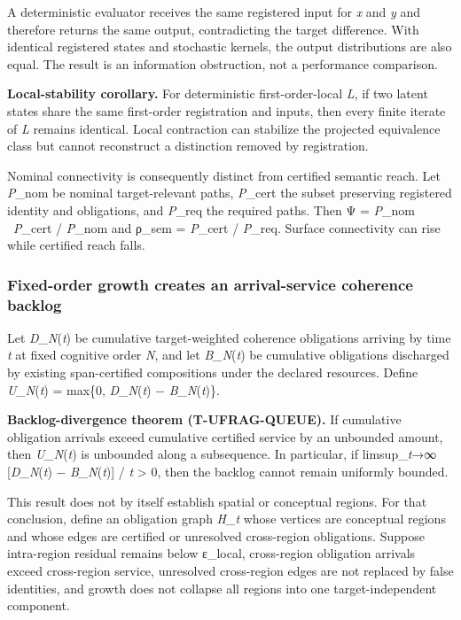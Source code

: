 A deterministic evaluator receives the same registered input for
\emph{x} and \emph{y} and therefore returns the same output,
contradicting the target difference. With identical registered states
and stochastic kernels, the output distributions are also equal. The
result is an information obstruction, not a performance comparison.

\textbf{Local-stability corollary.} For deterministic first-order-local
\emph{L}, if two latent states share the same first-order registration
and inputs, then every finite iterate of \emph{L} remains identical.
Local contraction can stabilize the projected equivalence class but
cannot reconstruct a distinction removed by registration.

Nominal connectivity is consequently distinct from certified semantic
reach. Let \emph{P}\_nom be nominal target-relevant paths,
\emph{P}\_cert the subset preserving registered identity and
obligations, and \emph{P}\_req the required paths. Then Ψ =
\textbar{}\emph{P}\_nom ~\emph{P}\_cert\textbar{} /
\textbar{}\emph{P}\_nom\textbar{} and ρ\_sem =
\textbar{}\emph{P}\_cert\textbar{} / \textbar{}\emph{P}\_req\textbar.
Surface connectivity can rise while certified reach falls.

\hypertarget{fixed-order-growth-creates-an-arrival-service-coherence-backlog}{%
\subsubsection{Fixed-order growth creates an arrival-service coherence
backlog}\label{fixed-order-growth-creates-an-arrival-service-coherence-backlog}}

Let \emph{D\_N}(\emph{t}) be cumulative target-weighted coherence
obligations arriving by time \emph{t} at fixed cognitive order \emph{N},
and let \emph{B\_N}(\emph{t}) be cumulative obligations discharged by
existing span-certified compositions under the declared resources.
Define \emph{U\_N}(\emph{t}) = max\{0, \emph{D\_N}(\emph{t}) −
\emph{B\_N}(\emph{t})\}.

\textbf{Backlog-divergence theorem (T-UFRAG-QUEUE).} If cumulative
obligation arrivals exceed cumulative certified service by an unbounded
amount, then \emph{U\_N}(\emph{t}) is unbounded along a subsequence. In
particular, if limsup\_\emph{t}→∞ {[}\emph{D\_N}(\emph{t}) −
\emph{B\_N}(\emph{t}){]} / \emph{t} \textgreater{} 0, then the backlog
cannot remain uniformly bounded.

This result does not by itself establish spatial or conceptual regions.
For that conclusion, define an obligation graph \emph{H\_t} whose
vertices are conceptual regions and whose edges are certified or
unresolved cross-region obligations. Suppose intra-region residual
remains below ε\_local, cross-region obligation arrivals exceed
cross-region service, unresolved cross-region edges are not replaced by
false identities, and growth does not collapse all regions into one
target-independent component.

